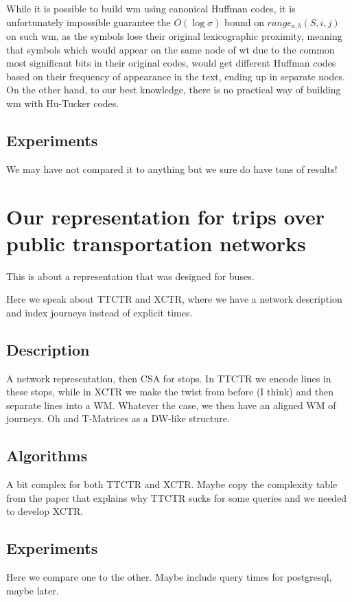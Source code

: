 \documentclass[a4paper,10pt,twoside]{book}
\begin{document}
    While it is possible to build \gls{wm} using canonical Huffman codes, it is unfortunately impossible guarantee the $O(\log\sigma)$ bound on $range_{a,b}(S,i,j)$ on such \gls{wm}, as the symbols lose their original lexicographic proximity, meaning that symbols which would appear on the same node of \gls{wt} due to the common most significant bits in their original codes, would get different Huffman codes based on their frequency of appearance in the text, ending up in separate nodes. On the other hand, to our best knowledge, there is no practical way of building \gls{wm} with Hu-Tucker codes.
	
	\section{Experiments}
	We may have not compared it to anything but we sure do have tons of results!
	
\chapter{Our representation for trips over public transportation networks}
\label{sec:newctr}
	This is about a representation that was designed for buses.
	
	Here we speak about TTCTR and XCTR, where we have a network description and index journeys instead of explicit times.
	
	\section{Description}
	A network representation, then CSA for stops. In TTCTR we encode lines in these stops, while in XCTR we make the twist from before (I think) and then separate lines into a WM. Whatever the case, we then have an aligned WM of journeys. Oh and T-Matrices as a DW-like structure.
	
	\section{Algorithms}
	A bit complex for both TTCTR and XCTR. Maybe copy the complexity table from the paper that explains why TTCTR sucks for some queries and we needed to develop XCTR.
	
	\section{Experiments}
	Here we compare one to the other. Maybe include query times for postgresql, maybe later.
	
\end{document}
